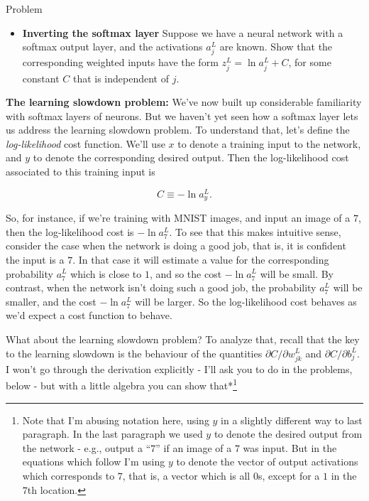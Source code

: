 \begin{exerciseBox}{Problem}


\begin{itemize}

\item \textbf{Inverting the softmax layer} Suppose we have a neural network with a softmax output layer, and the activations $a^L_j$ are known. Show that the corresponding weighted inputs have the form $z^L_j = \ln a^L_j + C$, for some constant $C$ that is independent of $j$.

\end{itemize}


\textbf{The learning slowdown problem:} We've now built up considerable familiarity with softmax layers of neurons. But we haven't yet seen how a softmax layer lets us address the learning slowdown problem. To understand that, let's define the \emph{log-likelihood} cost function. We'll use $x$ to denote a training input to the network, and $y$ to denote the corresponding desired output. Then the log-likelihood cost associated to this training input is

\begin{equation}
C \equiv -\ln a^L_y.
\tag{80}
\end{equation}

\noindent So, for instance, if we're training with MNIST images, and input an image of a $7$, then the log-likelihood cost is $-\ln a^L_7$. To see that this makes intuitive sense, consider the case when the network is doing a good job, that is, it is confident the input is a $7$. In that case it will estimate a value for the corresponding probability $a^L_7$ which is close to $1$, and so the cost $-\ln a^L_7$ will be small. By contrast, when the network isn't doing such a good job, the probability $a^L_7$ will be smaller, and the cost $-\ln a^L_7$ will be larger. So the log-likelihood cost behaves as we'd expect a cost function to behave.


What about the learning slowdown problem? To analyze that, recall that the key to the learning slowdown is the behaviour of the quantities $\partial C / \partial w^L_{jk}$ and $\partial C / \partial b^L_j$. I won't go through the derivation explicitly - I'll ask you to do in the problems, below - but with a little algebra you can show that*\footnote{Note that I'm abusing notation here, using $y$ in a slightly different way to last paragraph. In the last paragraph we used $y$ to denote the desired output from the network - e.g., output a ``$7$'' if an image of a $7$ was input. But in the equations which follow I'm using $y$ to denote the vector of output activations which corresponds to $7$, that is, a vector which is all $0$s, except for a $1$ in the $7$th location.}


\end{exerciseBox}
